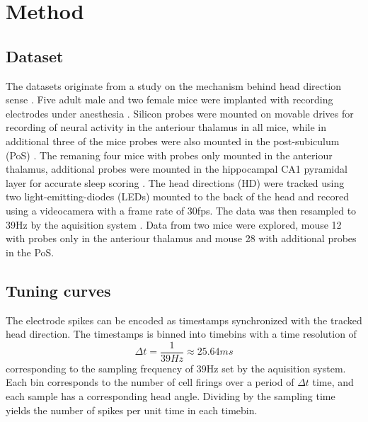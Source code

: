 \section{Method}

\subsection{Dataset}
The datasets originate from a study on the mechanism behind head direction sense \cite{projectdata}.
Five adult male and two female mice were implanted with recording electrodes under anesthesia \cite{projectdata}.
Silicon probes were mounted on movable drives for recording of neural activity in the anteriour thalamus in all mice, while in additional three of the mice probes were also mounted in the post-subiculum (PoS) \cite{projectdata}. The remaning four mice with probes only mounted in the anteriour thalamus, additional probes were mounted in the hippocampal CA1 pyramidal layer for accurate sleep scoring \cite{projectdata}.
The head directions (HD) were tracked using two light-emitting-diodes (LEDs) mounted to the back of the head and recored using a videocamera with a frame rate of 30fps. The data was then resampled to 39Hz by the aquisition system \cite{projectdata}.
Data from two mice were explored, mouse 12 with probes only in the anteriour thalamus and mouse 28 with additional probes in the PoS.  
\subsection{Tuning curves}
The electrode spikes can be encoded as timestamps synchronized with the tracked head direction. The timestamps is binned into timebins with a time resolution of 
$$\Delta t = \frac{1}{39Hz} \approx 25.64ms$$ 
corresponding to the sampling frequency of $39$Hz set by the aquisition system.
Each bin corresponds to the number of cell firings over a period of $\Delta t$ time, and each sample has a corresponding head angle.
Dividing by the sampling time yields the number of spikes per unit time in each timebin.

